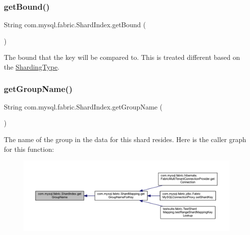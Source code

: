 \subsubsection{\texorpdfstring{get\+Bound()}{getBound()}}
{\footnotesize\ttfamily String com.\+mysql.\+fabric.\+Shard\+Index.\+get\+Bound (\begin{DoxyParamCaption}{ }\end{DoxyParamCaption})}

The bound that the key will be compared to. This is treated different based on the \mbox{\hyperlink{enumcom_1_1mysql_1_1fabric_1_1_sharding_type}{Sharding\+Type}}. \mbox{\label{classcom_1_1mysql_1_1fabric_1_1_shard_index_a4ffb7b10c54b394c2a7d17d53e04a83a}} 
\subsubsection{\texorpdfstring{get\+Group\+Name()}{getGroupName()}}
{\footnotesize\ttfamily String com.\+mysql.\+fabric.\+Shard\+Index.\+get\+Group\+Name (\begin{DoxyParamCaption}{ }\end{DoxyParamCaption})}

The name of the group in the data for this shard resides. Here is the caller graph for this function\+:\nopagebreak
\begin{figure}[H]
\begin{center}
\leavevmode
\includegraphics[width=350pt]{classcom_1_1mysql_1_1fabric_1_1_shard_index_a4ffb7b10c54b394c2a7d17d53e04a83a_icgraph}
\end{center}
\end{figure}
\mbox{\label{classcom_1_1mysql_1_1fabric_1_1_shard_index_a6e58c9b169c3978e86c12060f71680b6}} 
